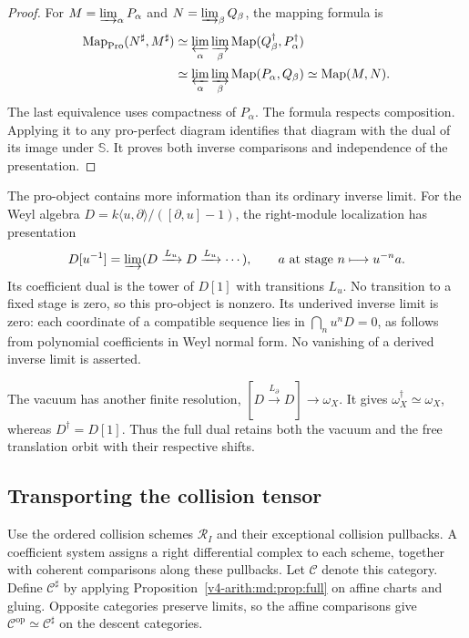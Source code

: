 \begin{proof}
For $M=\varinjlim_\alpha P_\alpha$ and
$N=\varinjlim_\beta Q_\beta$, the mapping formula is
\begin{align*}
 \operatorname{Map}_{\mathrm{Pro}}(N^\sharp,M^\sharp)
 &\simeq\varprojlim_\alpha\varinjlim_\beta
       \operatorname{Map}(Q_\beta^\dagger,P_\alpha^\dagger)\\
 &\simeq\varprojlim_\alpha\varinjlim_\beta
       \operatorname{Map}(P_\alpha,Q_\beta)
 \simeq\operatorname{Map}(M,N).
\end{align*}
The last equivalence uses compactness of $P_\alpha$.
The formula respects composition. Applying it to any
pro-perfect diagram identifies that diagram with the dual
of its image under $\mathbb S$. It proves both inverse
comparisons and independence of the presentation.
\end{proof}

The pro-object contains more information than its ordinary
inverse limit. For the Weyl algebra
$D=k\langle u,\partial\rangle/([\partial,u]-1)$, the
right-module localization has presentation
\[
 D[u^{-1}]=\varinjlim
 (D\xrightarrow{L_u}D\xrightarrow{L_u}\cdots),
 \qquad a\text{ at stage }n\longmapsto u^{-n}a.
\]
Its coefficient dual is the tower of $D[1]$ with transitions
$L_u$. No transition to a fixed stage is zero, so this
pro-object is nonzero. Its underived inverse limit is zero:
each coordinate of a compatible sequence lies in
$\bigcap_nu^nD=0$, as follows from polynomial coefficients
in Weyl normal form. No vanishing of a derived inverse
limit is asserted.

The vacuum has another finite resolution,
$[D\xrightarrow{L_\partial}D]\to\omega_X$.
It gives $\omega_X^\dagger\simeq\omega_X$, whereas
$D^\dagger=D[1]$. Thus the full dual retains both the
vacuum and the free translation orbit with their respective
shifts.

\subsection{Transporting the collision tensor}

Use the ordered collision schemes $\mathscr R_I$ and their
exceptional collision pullbacks. A coefficient system
assigns a right differential complex to each scheme,
together with coherent comparisons along these pullbacks.
Let $\mathcal C$ denote this category. Define
$\mathcal C^\sharp$ by applying
Proposition~\ref{v4-arith:md:prop:full} on affine charts and
gluing. Opposite categories preserve limits, so the affine
comparisons give $\mathcal C^{\mathrm{op}}\simeq
\mathcal C^\sharp$ on the descent categories.

